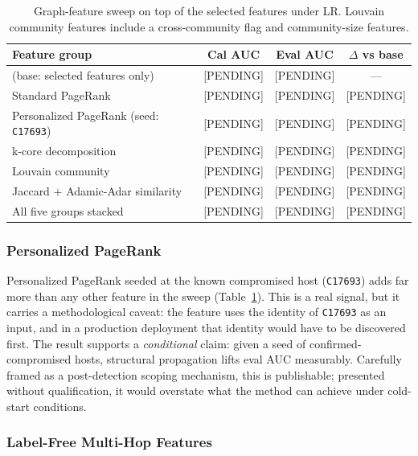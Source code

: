 \begin{table}[h]
\centering
\begin{tabular}{lccc}
\hline
Feature group & Cal AUC & Eval AUC & $\Delta$ vs base \\
\hline
(base: selected features only)                         & [PENDING] & [PENDING] & --- \\
Standard PageRank                                & [PENDING] & [PENDING] & [PENDING] \\
Personalized PageRank (seed: \texttt{C17693})   & [PENDING] & [PENDING] & [PENDING] \\
k-core decomposition                            & [PENDING] & [PENDING] & [PENDING] \\
Louvain community                                & [PENDING] & [PENDING] & [PENDING] \\
Jaccard $+$ Adamic-Adar similarity              & [PENDING] & [PENDING] & [PENDING] \\
All five groups stacked                          & [PENDING] & [PENDING] & [PENDING] \\
\hline
\end{tabular}
\caption{Graph-feature sweep on top of the selected features under LR. Louvain community features include a cross-community flag and community-size features.}
\label{tab:graph_sweep}
\end{table}

\subsubsection{Personalized PageRank}

Personalized PageRank seeded at the known compromised host (\texttt{C17693}) adds far more than any other feature in the sweep (Table~\ref{tab:graph_sweep}). This is a real signal, but it carries a methodological caveat: the feature uses the identity of \texttt{C17693} as an input, and in a production deployment that identity would have to be discovered first. The result supports a \emph{conditional} claim: given a seed of confirmed-compromised hosts, structural propagation lifts eval AUC measurably. Carefully framed as a post-detection scoping mechanism, this is publishable; presented without qualification, it would overstate what the method can achieve under cold-start conditions.

\subsubsection{Label-Free Multi-Hop Features}

